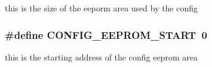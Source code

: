 this is the size of the eeporm area used by the config 

\hypertarget{group__config_gaa82407faddc0bb6f2e8e8acc8938ed96}{
\subsubsection[{C\+O\+N\+F\+I\+G\+\_\+\+E\+E\+P\+R\+O\+M\+\_\+\+S\+T\+A\+R\+T}]{\setlength{\rightskip}{0pt plus 5cm}\#define C\+O\+N\+F\+I\+G\+\_\+\+E\+E\+P\+R\+O\+M\+\_\+\+S\+T\+A\+R\+T~0}}\label{group__config_gaa82407faddc0bb6f2e8e8acc8938ed96}


this is the starting address of the config eeprom area 

